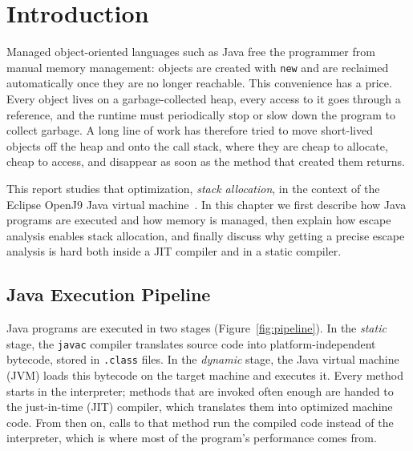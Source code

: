 \chapter{Introduction}

Managed object-oriented languages such as Java free the programmer from manual memory
management: objects are created with \texttt{new} and are reclaimed automatically once they
are no longer reachable. This convenience has a price. Every object lives on a garbage-collected
heap, every access to it goes through a reference, and the runtime must periodically stop or
slow down the program to collect garbage. A long line of work has therefore tried to move
short-lived objects off the heap and onto the call stack, where they are cheap to allocate,
cheap to access, and disappear as soon as the method that created them returns.

This report studies that optimization, \emph{stack allocation}, in the context of the Eclipse
OpenJ9 Java virtual machine~\cite{openj9}. In this chapter we first describe how Java programs
are executed and how memory is managed, then explain how escape analysis enables stack
allocation, and finally discuss why getting a precise escape analysis is hard both inside a JIT
compiler and in a static compiler.

\section{Java Execution Pipeline}

Java programs are executed in two stages (Figure~\ref{fig:pipeline}). In the \emph{static}
stage, the \texttt{javac} compiler translates source code into platform-independent
bytecode, stored in \texttt{.class} files. In the \emph{dynamic} stage, the Java virtual machine
(JVM) loads this bytecode on the target machine and executes it. Every method starts in the
interpreter; methods that are invoked often enough are handed to the just-in-time (JIT) compiler,
which translates them into optimized machine code. From then on, calls to that method run the
compiled code instead of the interpreter, which is where most of the program's performance
comes from.

